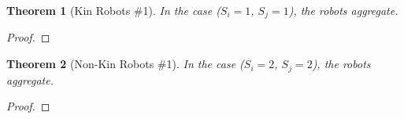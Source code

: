 \documentclass[letterpaper, 10 pt, conference]{ieeeconf}
\newtheorem{theorem}{Theorem}
\begin{document}
  \begin{theorem}[Kin Robots \#1]\label{thm:kin_1}
    In the case ($S_i=1$, $S_j=1$), the robots aggregate.
  \end{theorem}
  \begin{proof}


  \end{proof}

  \begin{theorem}[Non-Kin Robots \#1]\label{thm:non_kin_1}
    In the case ($S_i=2$, $S_j=2$), the robots aggregate.
  \end{theorem}
  \begin{proof}
  \end{proof}
\end{document}
